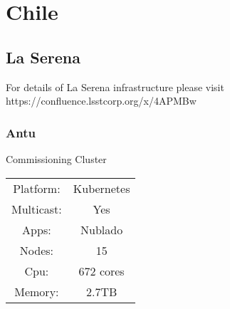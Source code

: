 \section{Chile}
\subsection{La Serena}
For details of La Serena infrastructure please visit https://confluence.lsstcorp.org/x/4APMBw
\newpage
\subsubsection{Antu}

Commissioning Cluster

\begin{center}
  \begin{tabular}{ |c|c| } 
   \hline
   Platform: & Kubernetes \\ 
   Multicast: & Yes \\ 
   Apps: & Nublado \\ 
   Nodes: & 15 \\ 
   Cpu: & 672 cores \\ 
   Memory: & 2.7TB \\ 
   \hline
  \end{tabular}
\end{center}

